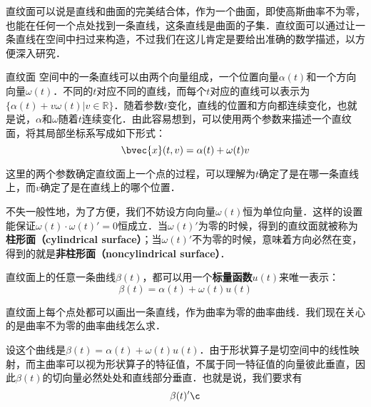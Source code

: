 

直纹面可以说是直线和曲面的完美结合体，作为一个曲面，即使高斯曲率不为零，也能在任何一个点处找到一条直线，这条直线是曲面的子集．直纹面可以通过让一条直线在空间中扫过来构造，不过我们在这儿肯定是要给出准确的数学描述，以方便深入研究．

\begin{definition}{直纹面}
空间中的一条直线可以由两个向量组成，一个位置向量$\alpha(t)$和一个方向向量$\omega(t)$．不同的$t$对应不同的直线，而每个$t$对应的直线可以表示为$\{\alpha(t)+v\omega(t)|v\in\mathbb{R}\}$．随着参数$t$变化，直线的位置和方向都连续变化，也就是说，$\alpha$和$\omega$随着$t$连续变化．由此容易想到，可以使用两个参数来描述一个直纹面，将其局部坐标系写成如下形式：
\begin{equation}
\bvec{x}(t, v)=\alpha(t)+\omega(t)v
\end{equation}
\end{definition}


这里的两个参数确定直纹面上一个点的过程，可以理解为$t$确定了是在哪一条直线上，而$v$确定了是在直线上的哪个位置．

不失一般性地，为了方便，我们不妨设方向向量$\omega(t)$恒为单位向量．这样的设置能保证$\omega(t)\cdot\omega(t)'=0$恒成立．当$\omega(t)'$为零的时候，得到的直纹面就被称为\textbf{柱形面（cylindrical surface）}；当$\omega(t)'$不为零的时候，意味着方向必然在变，得到的就是\textbf{非柱形面（noncylindrical surface）}．

直纹面上的任意一条曲线$\beta(t)$，都可以用一个\textbf{标量函数}$u(t)$来唯一表示：\begin{equation}
\beta(t)=\alpha(t)+\omega(t)u(t)
\end{equation}

直纹面上每个点处都可以画出一条直线，作为曲率为零的曲率曲线．我们现在关心的是曲率不为零的曲率曲线怎么求．

设这个曲线是$\beta(t)=\alpha(t)+\omega(t)u(t)$．由于形状算子是切空间中的线性映射，而主曲率可以视为形状算子的特征值，不属于同一特征值的向量彼此垂直，因此$\beta(t)$的切向量必然处处和直线部分垂直．也就是说，我们要求有
\begin{equation}
\beta(t)'\c
\end{equation}






